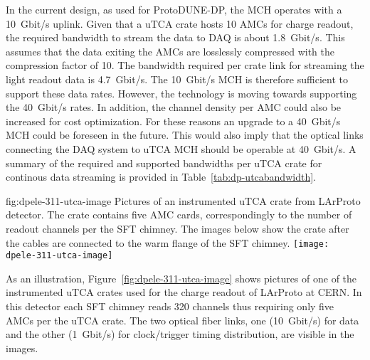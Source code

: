 In the current design, as used for ProtoDUNE-DP, the MCH operates with a \SI{10}{Gbit/s} uplink. Given that a uTCA crate hosts \num{10} AMCs for charge readout, the required bandwidth to stream the data to DAQ is about \SI{1.8}{Gbit/s}. This assumes that the data exiting the AMCs are losslessly compressed with the compression factor of \num{10}. The bandwidth required per crate link for streaming the light readout data is \SI{4.7}{Gbit/s}. The \SI{10}{Gbit/s} MCH is therefore sufficient to support these data rates. However, the technology is moving towards supporting the \SI{40}{Gbit/s} rates. In addition, the channel density per AMC could also be increased for cost optimization. For these reasons an upgrade to a \SI{40}{Gbit/s} MCH could be foreseen in the future. This would also imply that the optical links connecting the DAQ system to uTCA MCH should be operable at \SI{40}{Gbit/s}. A summary of the required and supported bandwidths per uTCA crate for continous data streaming is provided in Table~\ref{tab:dp-utcabandwidth}.

\begin{dunefigure}{fig:dpele-311-utca-image}
{Pictures of an instrumented uTCA crate from LArProto detector. The crate contains five AMC cards, correspondingly to the number of readout channels per the SFT chimney. The images below show the crate after the  cables are connected to the warm flange of the SFT chimney.}
\texttt{[image: dpele-311-utca-image]}
\end{dunefigure}

As an illustration, Figure~\ref{fig:dpele-311-utca-image} shows pictures of one of the instrumented uTCA crates used for the charge readout of LArProto at CERN. In this detector each SFT chimney reads \num{320} channels thus requiring only five AMCs per the uTCA crate. The two optical fiber links, one (\SI{10}{Gbit/s}) for data and the other (\SI{1}{Gbit/s}) for clock/trigger timing distribution, are visible in the images.       

